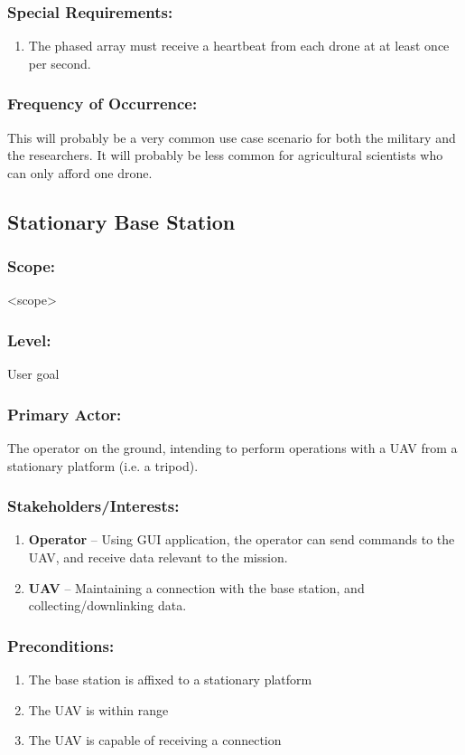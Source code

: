 \documentclass[ProductRequirements.tex]{subfiles}
\begin{document}
	\subsubsection*{Special Requirements:}
	\begin{enumerate}\itemsep1pt
		\item The phased array must receive a heartbeat from each drone at at least once per second.
	\end{enumerate}
	\subsubsection*{Frequency of Occurrence:}
	This will probably be a very common use case scenario for both the military and the researchers. It will probably be less common for agricultural scientists who can only afford one drone.
	
	
	\subsection{Stationary Base Station}
	\subsubsection*{Scope:}
	<scope>
	\subsubsection*{Level:}
	User goal
	\subsubsection*{Primary Actor:}
	The operator on the ground, intending to perform operations with a UAV from a stationary platform (i.e. a tripod).
	\subsubsection*{Stakeholders/Interests:}
	\begin{enumerate}\itemsep1pt
		\item \textbf{Operator} -- Using GUI application, the operator can send commands to the UAV, and receive data relevant to the mission. 
		\item \textbf{UAV} -- Maintaining a connection with the base station, and collecting/downlinking data. 
	\end{enumerate}
	\subsubsection*{Preconditions:}
	\begin{enumerate}\itemsep1pt
		\item The base station is affixed to a stationary platform
		\item The UAV is within range
		\item The UAV is capable of receiving a connection
	\end{enumerate}
\end{document}
